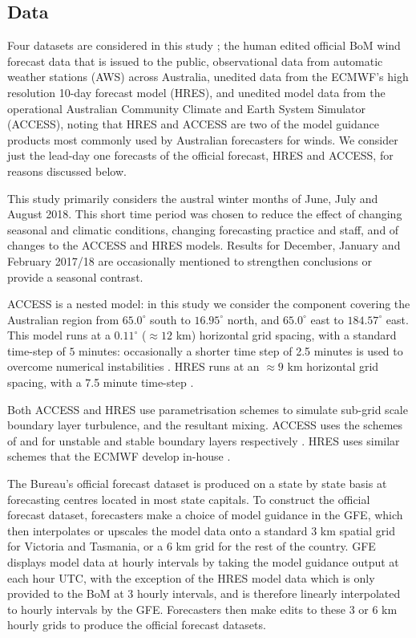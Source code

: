 \documentclass[twocol]{ametsoc}
\begin{document}
\subsection{Data}
Four datasets are considered in this study \citep{shortData19}; the human edited official BoM wind forecast data that is issued to the public, observational data from automatic weather stations (AWS) across Australia, unedited data from the ECMWF's high resolution 10-day forecast model (HRES), and unedited model data from the operational Australian Community Climate and Earth System Simulator (ACCESS), noting that HRES and ACCESS are two of the model guidance products most commonly used by Australian forecasters for winds. We consider just the lead-day one forecasts of the official forecast, HRES and ACCESS, for reasons discussed below. 

This study primarily considers the austral winter months of June, July and August 2018. This short time period was chosen to reduce the effect of changing seasonal and climatic conditions, changing forecasting practice and staff, and of changes to the ACCESS and HRES models. Results for December, January and February 2017/18 are occasionally mentioned to strengthen conclusions or provide a seasonal contrast. 

ACCESS is a nested model: in this study we consider the component covering the Australian region from $65.0^\circ$ south to $16.95^\circ$ north, and $65.0^\circ$ east to $184.57^\circ$ east. This model runs at a $0.11^\circ$ ($\approx 12$ km) horizontal grid spacing, with a standard time-step of $5$ minutes: occasionally a shorter time step of 2.5 minutes is used to overcome numerical instabilities \citep{bom16}. HRES runs at an $\approx 9$ km horizontal grid spacing, with a 7.5 minute time-step \citep{ecmwf19c}. 

Both ACCESS and HRES use parametrisation schemes to simulate sub-grid scale boundary layer turbulence, and the resultant mixing. ACCESS uses the schemes of \citet{lock00} and \citet{louis79} for unstable and stable boundary layers respectively \citep{bom10}. HRES uses similar schemes that the ECMWF develop in-house \citep{ecmwf19a}.

The Bureau's official forecast dataset is produced on a state by state basis at forecasting centres located in most state capitals. To construct the official forecast dataset, forecasters make a choice of model guidance in the GFE, which then interpolates or upscales the model data onto a standard 3 km spatial grid for Victoria and Tasmania, or a 6 km grid for the rest of the country. GFE displays model data at hourly intervals by taking the model guidance output at each hour UTC, with the exception of the HRES model data which is only provided to the BoM at 3 hourly intervals, and is therefore linearly interpolated to hourly intervals by the GFE. Forecasters then make edits to these 3 or 6 km hourly grids to produce the official forecast datasets. 
\end{document}
